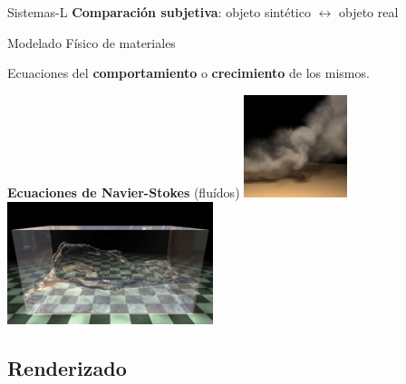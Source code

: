 \documentclass[spanish,unknownkeysallowed]{beamer}
\begin{document}
\begin{frame}{}
\begin{block}{Sistemas-L}
\textbf{Comparación subjetiva}: objeto sintético $\leftrightarrow$ objeto real
\end{block}

\begin{block}{Modelado Físico de materiales}

Ecuaciones del \textbf{comportamiento} o \textbf{crecimiento} de los mismos.

\textbf{Ecuaciones de Navier-Stokes} (fluídos)
\center
\includegraphics[width=3cm]{../figures/smoke}
\includegraphics[width=6cm]{../figures/water}
\end{block}






\end{frame}

\subsection{Renderizado}
\end{document}
